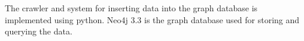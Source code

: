 The crawler and system for inserting data into the graph database is implemented using python.
Neo4j 3.3 is the graph database used for storing and querying the data.
